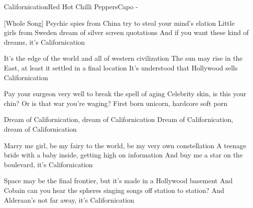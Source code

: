 \begin{song}{Californication}{Red Hot Chilli Peppers}{Capo -}

[Whole Song]
Psychic spies from China
try to steal your mind's elation
Little girls from Sweden dream of silver screen quotations
And if you want these kind of dreams, it's Californication


It's the edge of the world and all of western civilization
The sun may rise in the East, at least it settled in a final location
It's understood that Hollywood sells Californication


Pay your surgeon very well to break the spell of aging
Celebrity skin, is this your chin? Or is that war you're waging?
   First born unicorn,     hardcore soft porn

Dream of Californication,   dream of Californication
Dream of Californication,   dream of Californication

Marry me girl, be my fairy to the world, be my very own constellation
A teenage bride with a baby inside, getting high on information
And buy me a star on the boulevard, it's Californication


Space may be the final frontier, but it's made in a Hollywood basement
And Cobain can you hear the spheres singing songs off station to station?
And Alderaan's not far away, it's Californication


\end{song}
